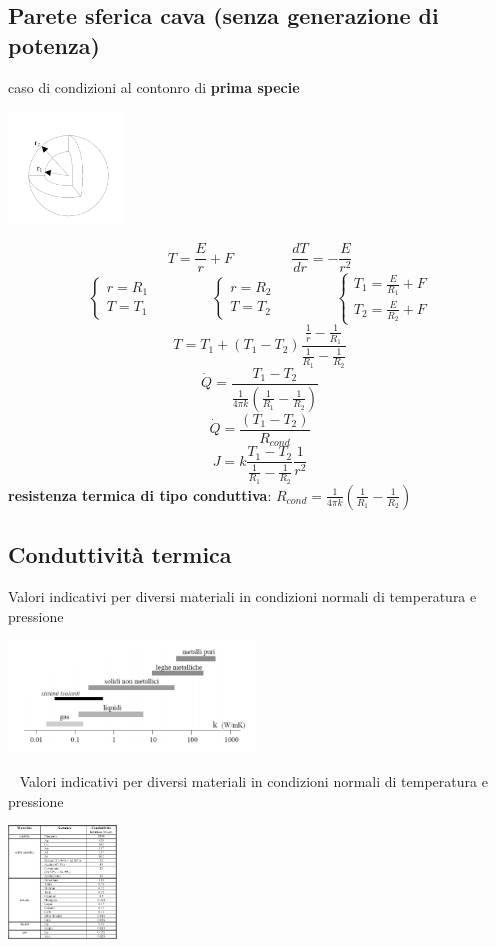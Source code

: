 \subsection{Parete sferica cava (senza generazione di potenza)}
caso di condizioni al contonro di \textbf{prima specie}
\begin{center}
    \includegraphics[height=3cm]{../L10/img11.PNG}
\end{center}
\[
    T = \frac{E}{r} + F \;\;\;\;\;\;\;\;\;\;\;\;\;\;\;\frac{dT}{dr} = - \frac{E}{r^2}
\]
\[
    \begin{cases}
        r = R_1 \\ T= T_1
    \end{cases} \;\;\;\;\;\;\;\;\;\;\;\;\;\;\;\begin{cases}
        r=R_2 \\ T=T_2
    \end{cases} \;\;\;\;\;\;\;\;\;\;\;\;\;\;\; \begin{cases}
        T_1 = \frac{E}{R_1} + F \\ T_2 = \frac{E}{R_2}+ F
    \end{cases}
\]
\[
    T= T_1 + (T_1-T_2) \frac{\frac{1}{r} - \frac{1}{R_1}}{\frac{1}{R_1} - \frac{1}{R_2}}
\]
\[
    \dot{Q} = \frac{T_1-T_2}{\frac{1}{4 \pi k} \left( \frac{1}{R_1}- \frac{1}{R_2} \right)}
\]
\[
    \dot{Q}= \frac{(T_1-T_2)}{R_{cond}}
\]
\[
    J = k \frac{T_1-T_2}{\frac{1}{R_1}- \frac{1}{R_2}} \frac{1}{r^2}
\]
\textbf{resistenza termica di tipo conduttiva}: $R_{cond} = \frac{1}{4\pi k} \left( \frac{1}{R_1} - \frac{1}{R_2} \right)$
\subsection{Conduttività termica}
Valori indicativi per diversi materiali in condizioni normali di temperatura e pressione
\begin{center}
    \includegraphics[height=3cm]{../L10/img12.PNG}
\end{center}
\ \newline
Valori indicativi per diversi materiali in condizioni normali di temperatura e pressione
\begin{center}
    \includegraphics[height=3cm]{../L10/img13.PNG}
\end{center}
